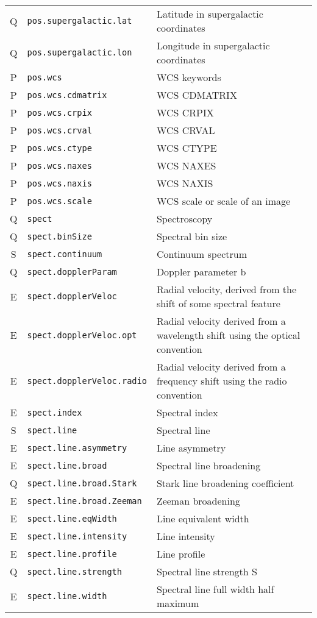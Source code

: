 \documentclass[11pt,a4paper]{ivoa}
\begin{document}
\begin{longtable}[h!]{c|p{40ex}|p{}}
Q & {\tt pos.supergalactic.lat} & Latitude in supergalactic coordinates\\
Q & {\tt pos.supergalactic.lon} & Longitude in supergalactic coordinates\\
P & {\tt pos.wcs} & WCS keywords\\
P & {\tt pos.wcs.cdmatrix} & WCS CDMATRIX\\
P & {\tt pos.wcs.crpix} & WCS CRPIX\\
P & {\tt pos.wcs.crval} & WCS CRVAL\\
P & {\tt pos.wcs.ctype} & WCS CTYPE\\
P & {\tt pos.wcs.naxes} & WCS NAXES\\
P & {\tt pos.wcs.naxis} & WCS NAXIS\\
P & {\tt pos.wcs.scale} & WCS scale or scale of an image\\
Q & {\tt spect} & Spectroscopy\\
Q & {\tt spect.binSize} & Spectral bin size\\
S & {\tt spect.continuum} & Continuum spectrum\\
Q & {\tt spect.dopplerParam} & Doppler parameter b\\
E & {\tt spect.dopplerVeloc} & Radial velocity, derived from the shift of some spectral feature\\
E & {\tt spect.dopplerVeloc.opt} & Radial velocity derived from a wavelength shift using the optical convention\\
E & {\tt spect.dopplerVeloc.radio} & Radial velocity derived from a frequency shift using the radio convention\\
E & {\tt spect.index} & Spectral index\\
S & {\tt spect.line} & Spectral line\\
E & {\tt spect.line.asymmetry} & Line asymmetry\\
E & {\tt spect.line.broad} & Spectral line broadening\\
Q & {\tt spect.line.broad.Stark} & Stark line broadening coefficient\\
E & {\tt spect.line.broad.Zeeman} & Zeeman broadening\\
E & {\tt spect.line.eqWidth} & Line equivalent width\\
E & {\tt spect.line.intensity} & Line intensity\\
E & {\tt spect.line.profile} & Line profile\\
Q & {\tt spect.line.strength} & Spectral line strength S\\
E & {\tt spect.line.width} & Spectral line full width half maximum\\

\end{longtable}
\end{document}
